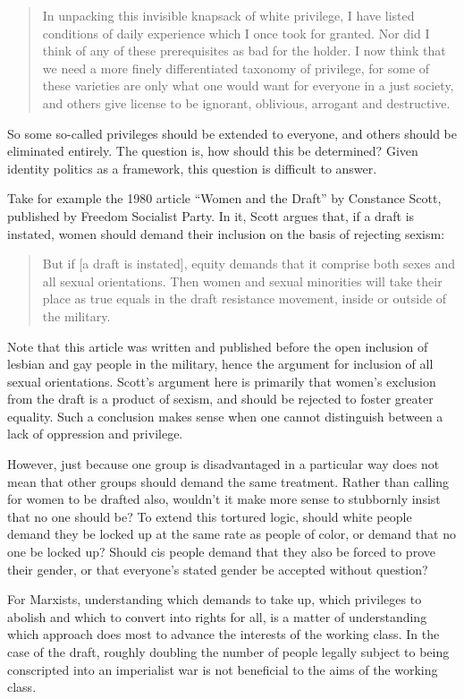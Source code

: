 \blockquote{In unpacking this invisible knapsack of white privilege, I have listed conditions of daily experience which I once took for granted. Nor did I think of any of these prerequisites as bad for the holder. I now think that we need a more finely differentiated taxonomy of privilege, for some of these varieties are only what one would want for everyone in a just society, and others give license to be ignorant, oblivious, arrogant and destructive.}

So some so-called privileges should be extended to everyone, and others should be eliminated entirely. The question is, how should this be determined? Given identity politics as a framework, this question is difficult to answer.

Take for example the 1980 article ``Women and the Draft'' by Constance Scott, published by Freedom Socialist Party. In it, Scott argues that, if a draft is instated, women should demand their inclusion on the basis of rejecting sexism:

\blockquote{But if [a draft is instated], equity demands that it comprise both sexes and all sexual orientations. Then women and sexual minorities will take their place as true equals in the draft resistance movement, inside or outside of the military.}

Note that this article was written and published before the open inclusion of lesbian and gay people in the military, hence the argument for inclusion of all sexual orientations. Scott's argument here is primarily that women's exclusion from the draft is a product of sexism, and should be rejected to foster greater equality. Such a conclusion makes sense when one cannot distinguish between a lack of oppression and privilege.

However, just because one group is disadvantaged in a particular way does not mean that other groups should demand the same treatment. Rather than calling for women to be drafted also, wouldn't it make more sense to stubbornly insist that no one should be? To extend this tortured logic, should white people demand they be locked up at the same rate as people of color, or demand that no one be locked up? Should cis people demand that they also be forced to prove their gender, or that everyone's stated gender be accepted without question?

For Marxists, understanding which demands to take up, which privileges to abolish and which to convert into rights for all, is a matter of understanding which approach does most to advance the interests of the working class. In the case of the draft, roughly doubling the number of people legally subject to being conscripted into an imperialist war is not beneficial to the aims of the working class.

